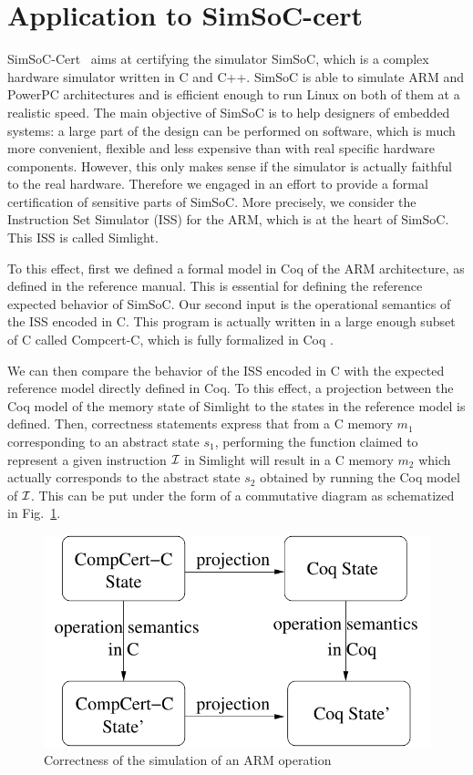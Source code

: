 \section{Application to SimSoC-cert}
\label{sec:simsoccert}

SimSoC-Cert~\cite{rapido11,cpp11} aims at certifying the simulator SimSoC, 
which is a complex hardware simulator written in C and C++.
SimSoC is able to simulate ARM and PowerPC architectures and is 
efficient enough to run Linux on both of them at a realistic speed.
The main objective of SimSoC is to help designers of embedded systems:
a large part of the design can be performed on software,
which is much more convenient, flexible and less expensive
than with real specific hardware components.
However, 
this only makes sense if the simulator is actually faithful to the real
hardware.
Therefore we engaged in an effort to provide a formal certification
of sensitive parts of SimSoC.
More precisely, we consider the Instruction Set Simulator (ISS)
for the ARM, which is at the heart of SimSoC.
This ISS is called Simlight.

To this effect, first we defined a formal model in Coq of the ARM
architecture, as defined in the reference manual.
This is essential for defining the reference expected behavior
of SimSoC.
Our second input is the operational semantics of the ISS
encoded in C. 
This program is actually written in a large enough subset of C
called Compcert-C,
which is fully formalized in Coq \cite{Leroy-Compcert-CACM}.

We can then compare the behavior of the ISS encoded in C 
with the expected reference model directly defined in Coq.
To this effect, a projection between the Coq model of the
memory state of Simlight to the states in the reference model
is defined.
Then, correctness statements express that from a 
C memory $m_1$ corresponding to an abstract state $s_1$,
performing the function claimed to represent a given instruction $\cal I$
in Simlight 
will result in a C memory $m_2$ which actually corresponds 
to the abstract state $s_2$ obtained by
running the Coq model of $\cal I$. 
This can be put under the form of a commutative diagram as
schematized in Fig.~\ref{fig:thrm}.

\begin{figure}
\hfil\includegraphics[width=.5\linewidth]{theorem.pdf}
\caption{Correctness of the simulation of an ARM operation}
\label{fig:thrm}
\end{figure}

